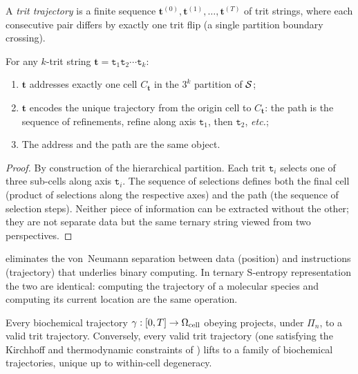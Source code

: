\begin{definition}
\label{def:trit-traj}
A \emph{trit trajectory} is a finite sequence $\mathbf{t}^{(0)},
\mathbf{t}^{(1)}, \ldots, \mathbf{t}^{(T)}$ of trit strings, where each
consecutive pair differs by exactly one trit flip (a single partition boundary
crossing).
\end{definition}

\begin{theorem}
\label{thm:pos-traj-duality}
For any $k$-trit string $\mathbf{t} = \mathtt{t}_1\mathtt{t}_2\cdots\mathtt{t}_k$:
\begin{enumerate}[label=(\alph*)]
    \item $\mathbf{t}$ addresses exactly one cell $C_\mathbf{t}$ in the
          $3^k$ partition of $\mathcal{S}$;
    \item $\mathbf{t}$ encodes the unique trajectory from the origin cell to
          $C_\mathbf{t}$: the path is the sequence of refinements, refine along
          axis $\mathtt{t}_1$, then $\mathtt{t}_2$, \emph{etc.};
    \item The address and the path are the same object.
\end{enumerate}
\end{theorem}

\begin{proof}
By construction of the hierarchical partition.  Each trit $\mathtt{t}_i$ selects
one of three sub-cells along axis $\mathtt{t}_i$.  The sequence of selections
defines both the final cell (product of selections along the respective axes)
and the path (the sequence of selection steps).  Neither piece of information
can be extracted without the other; they are not separate data but the same
ternary string viewed from two perspectives.
\end{proof}

 eliminates the von~Neumann separation between
data (position) and instructions (trajectory) that underlies binary computing.
In ternary S-entropy representation the two are identical: computing the
trajectory of a molecular species and computing its current location are the
same operation.

\begin{theorem}
\label{thm:trit-traj}
Every biochemical trajectory $\gamma:[0,T]\to\Omega_\mathrm{cell}$ obeying
 projects, under $\Pi_n$, to a valid trit trajectory.  Conversely,
every valid trit trajectory (one satisfying the Kirchhoff and thermodynamic
constraints of ) lifts to a family of biochemical
trajectories, unique up to within-cell degeneracy.
\end{theorem}

